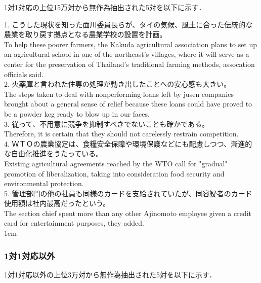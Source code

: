 1対1対応の上位15万対から無作為抽出された5対を以下に示す．


\vspace{1em}
\parindent 0cm
\footnotesize

1. こうした現状を知った面川委員長らが、タイの気候、風土に合った伝統的な農業を取り戻す拠点となる農業学校の設置を計画。\\
To help these poorer farmers, the Kakuda agricultural association plans to set up an agricultural school in one of the northeast's villages, where it will serve as a center for the preservation of Thailand's traditional farming methods, assocation officials said. \\

2. 火薬庫と言われた住専の処理が動き出したことへの安心感も大きい。\\
The steps taken to deal with nonperforming loans left by jusen companies brought about a general sense of relief because these loans could have proved to be a powder keg ready to blow up in our faces. \\

3. 従って、不用意に競争を抑制すべきでないことも確かである。\\
Therefore, it is certain that they should not carelessly restrain competition. \\

4. ＷＴＯの農業協定は、食糧安全保障や環境保護などにも配慮しつつ、漸進的な自由化推進をうたっている。\\
Existing agricultural agreements reached by the WTO call for "gradual" promotion of liberalization, taking into consideration food security and environmental protection. \\

5. 管理部門の他の社員も同様のカードを支給されていたが、同容疑者のカード使用額は社内最高だったという。\\
The section chief spent more than any other Ajinomoto employee given a credit card for entertainment purposes, they added.\\

\normalsize
\parindent 1em

\subsubsection*{1対1対応以外}

1対1対応以外の上位3万対から無作為抽出された5対を以下に示す．


\vspace{1em}
\parindent 0cm
\footnotesize


